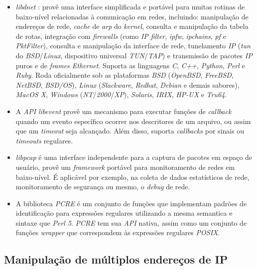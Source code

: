 \begin{itemize}
    \item \textit{libdnet} \cite{Libdnet}: provê uma interface simplificada e portável para muitas rotinas de baixo-nível relacionadas à comunicação em redes, incluindo: manipulação de endereços de rede, \textit{cache} de \textit{arp} do \textit{kernel}, consulta e manipulação da tabela de rotas, integração com \textit{firewalls} (como \textit{IP filter}, \textit{ipfw}, \textit{ipchains}, \textit{pf} e \textit{PktFilter}), consulta e manipulação da interface de rede, tunelamento \textit{IP} (\textit{tun} do \textit{BSD}/\textit{Linux}, dispositivo universal \textit{TUN}/\textit{TAP}) e transmissão de pacotes \textit{IP} puros e de \textit{frames Ethernet}. Suporta as linguagens \textit{C}, \textit{C++}, \textit{Python}, \textit{Perl} e \textit{Ruby}. Roda oficialmente sob as plataformas \textit{BSD} (\textit{OpenBSD}, \textit{FreeBSD}, \textit{NetBSD}, \textit{BSD/OS}), \textit{Linux} (\textit{Slackware}, \textit{Redhat}, \textit{Debian} e demais sabores), \textit{MacOS X}, \textit{Windows} (\textit{NT}/\textit{2000}/\textit{XP}), \textit{Solaris}, \textit{IRIX}, \textit{HP-UX} e \textit{Tru64}.

    \item A \textit{API} \textit{libevent} \cite{Libevent} provê um mecanismo para executar funções de \textit{callback} quando um evento específico ocorrer nos descritores de um arquivo, ou assim que um \textit{timeout} seja alcançado. Além disso, suporta \textit{callbacks} por sinais ou \textit{timeouts} regulares.

    \item \textit{libpcap} \cite{Libpcap} é uma interface independente para a captura de pacotes em espaço de usuário, provê um \textit{framework} portável para monitoramento de redes em baixo-nível. É aplicável por exemplo, na coleta de dados estatísticos de rede, monitoramento de segurança ou mesmo, o \textit{debug} de rede.

    \item A biblioteca \textit{PCRE} \cite{PCRE}  é um conjunto de funções que implementam padrões de identificação para expressões regulares utilizando a mesma semantica e sintaxe que \textit{Perl 5}. \textit{PCRE} tem sua \textit{API} nativa, assim como um conjunto de funções \textit{wrapper} que correspondem às expressões regulares \textit{POSIX}.
\end{itemize}


\subsection{Manipulação de múltiplos endereços de IP}

